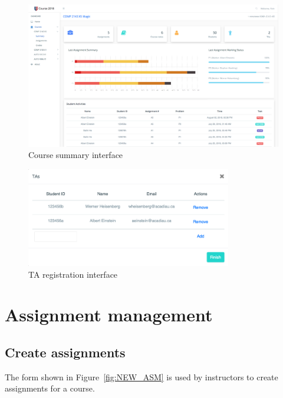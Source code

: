 \begin{figure}[H]
    \centering
        \includegraphics[width=1.0\textwidth]{figures/course-summary}
    \caption{Course summary interface}
    \label{fig:COURSE_SUMMARY}
\end{figure}

\begin{figure}[H]
    \centering
        \includegraphics[width=0.8\textwidth]{figures/reg-ta}
    \caption{TA registration interface}
    \label{fig:REG_TA}
\end{figure}


\section{Assignment management}

\subsection{Create assignments}
The form shown in Figure~\ref{fig:NEW_ASM} is used by instructors to create
assignments for a course.

